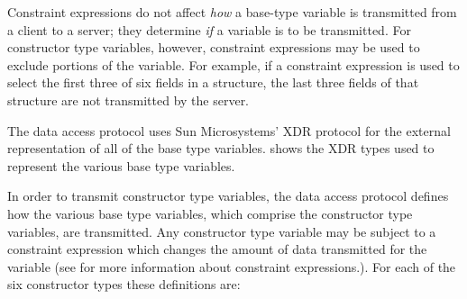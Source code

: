 Constraint expressions do not affect \emph{how} a base-type variable
is transmitted from a client to a server; they determine \emph{if} a
variable is to be transmitted. For constructor type variables,
however, constraint expressions may be used to exclude portions of the
variable. For example, if a constraint expression is used to select
the first three of six fields in a structure, the last three fields of
that structure are not transmitted by the server.

The data access protocol uses Sun Microsystems' XDR
protocol for the external representation of all of the base
type variables.  shows the XDR types used
to represent the various base type variables.

In order to transmit constructor type variables, the data access
protocol defines how the various base type variables, which comprise
the constructor type variables, are transmitted. Any constructor type
variable may be subject to a constraint expression which changes the
amount of data transmitted for the variable (see
 for more information about
constraint expressions.). For each of the six constructor types these
definitions are:

